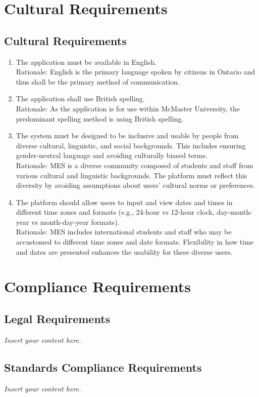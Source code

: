 \documentclass[12pt]{article}
\newcommand{\lips}{\textit{Insert your content here.}}
\begin{document}
\section{Cultural Requirements}
\subsection{Cultural Requirements}
\begin{enumerate}
  \item The application must be available in English. \\
  Rationale: English is the primary language spoken by citizens in Ontario and thus shall be the primary method of communication.
  \item The application shall use British spelling. \\
  Rationale: As the application is for use within McMaster University, the predominant spelling method is using British spelling.
  \item The system must be designed to be inclusive and usable by people from diverse cultural, linguistic, and social backgrounds. This includes ensuring gender-neutral language and avoiding culturally biased terms. \\
  Rationale:  MES is a diverse community composed of students and staff from various cultural and linguistic backgrounds. The platform must reflect this diversity by avoiding assumptions about users' cultural norms or preferences.
  \item The platform should allow users to input and view dates and times in different time zones and formats (e.g., 24-hour vs 12-hour clock, day-month-year vs month-day-year formats). \\
  Rationale: MES includes international students and staff who may be accustomed to different time zones and date formats. Flexibility in how time and dates are presented enhances the usability for these diverse users.
\end{enumerate}

\section{Compliance Requirements}
\subsection{Legal Requirements}
\lips
\subsection{Standards Compliance Requirements}
\lips
\end{document}
